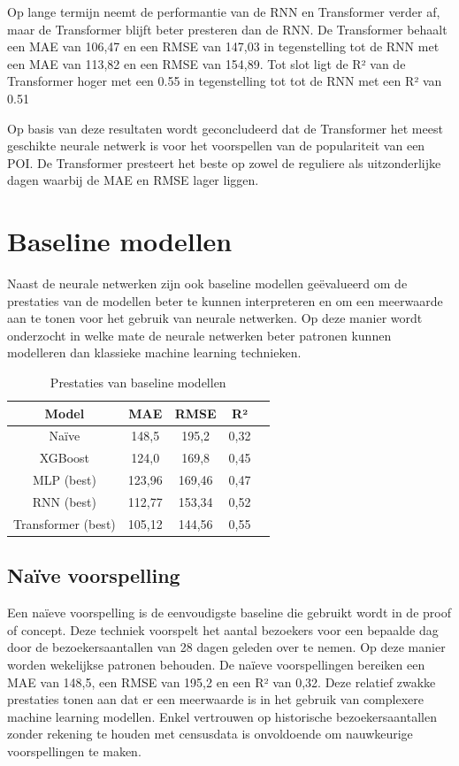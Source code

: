 Op lange termijn neemt de performantie van de RNN en Transformer verder af, maar de Transformer blijft beter presteren dan de RNN. De Transformer behaalt een MAE van 106,47 en een RMSE van 147,03 in tegenstelling tot de RNN met een MAE van 113,82 en een RMSE van 154,89. Tot slot ligt de R² van de Transformer hoger met een 0.55 in tegenstelling tot tot de RNN met een R² van 0.51

Op basis van deze resultaten wordt geconcludeerd dat de Transformer het meest geschikte neurale netwerk is voor het voorspellen van de populariteit van een POI. De Transformer presteert  het beste op zowel de reguliere als uitzonderlijke dagen waarbij de MAE en RMSE lager liggen.

\section{Baseline modellen}

Naast de neurale netwerken zijn ook baseline modellen geëvalueerd om de prestaties van de modellen beter te kunnen interpreteren en om een meerwaarde aan te tonen voor het gebruik van neurale netwerken. Op deze manier wordt onderzocht in welke mate de neurale netwerken beter patronen kunnen modelleren dan klassieke machine learning technieken.

\begin{table}[H]
    \centering
    \begin{tabular}{|c|c|c|c|c|}
        \hline
        \textbf{Model} & MAE & RMSE & R² \\ \hline
        Naïve & 148,5 & 195,2 & 0,32  \\ \hline
        XGBoost & 124,0  & 169,8 & 0,45  \\ \hline
        MLP (best) & 123,96  & 169,46 & 0,47 \\ \hline
        RNN (best) & 112,77  & 153,34 & 0,52  \\ \hline
        Transformer (best) & 105,12  & 144,56 & 0,55  \\ \hline
    \end{tabular}
    \caption{Prestaties van baseline modellen}
\end{table}

\subsection{Naïve voorspelling}

Een naïeve voorspelling is de eenvoudigste baseline die gebruikt wordt in de proof of concept. Deze techniek voorspelt het aantal bezoekers voor een bepaalde dag door de bezoekersaantallen van 28 dagen geleden over te nemen. Op deze manier worden wekelijkse patronen behouden. De naïeve voorspellingen bereiken een MAE van 148,5, een RMSE van 195,2 en een R² van 0,32. Deze relatief zwakke prestaties tonen aan dat er een meerwaarde is in het gebruik van complexere machine learning modellen. Enkel vertrouwen op historische bezoekersaantallen zonder rekening te houden met censusdata is onvoldoende om nauwkeurige voorspellingen te maken.

